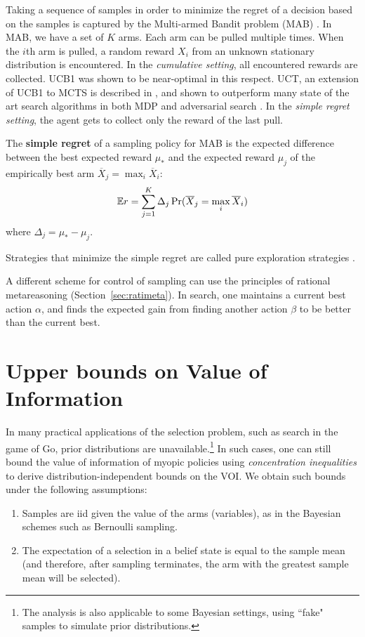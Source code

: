 Taking a sequence of samples in order to minimize the regret of a
decision based on the samples is captured by the Multi-armed Bandit
problem (MAB) \cite{Vermorel.bandits}. In MAB, we have a set of $K$
arms. Each arm can be pulled multiple times. When the $i$th arm is
pulled, a random reward $X_i$ from an unknown stationary distribution
is encountered. In the \textit{cumulative setting}, all encountered rewards are
collected.  UCB1 \cite{Auer.ucb} was shown to be
near-optimal in this respect. UCT, an extension of UCB1 to MCTS is
described in \cite{Kocsis.uct}, and shown to outperform many state of
the art search algorithms in both MDP and adversarial search
\cite{Gelly.mogo,Eyerich.ctp}. In the \textit{simple regret setting}, the agent
gets to collect only the reward of the last pull.
\begin{dfn}
The \textbf{simple regret} of a sampling policy for MAB
is the expected difference between the best expected reward
$\mu_*$ and the expected reward $\mu_j$ of the empirically best arm
$\overline X_j=\max_i\overline X_i$:
\begin{equation}
\mathbb{E} r=\sum_{j=1}^K\Delta_j\Pr(\overline X_j=\max_i\overline X_i)
\label{eqn:mcts-simple-regret}
\end{equation}
where $\Delta_j=\mu_*-\mu_j$.
\end{dfn}
Strategies that minimize the simple regret are called pure exploration
strategies \cite{Bubeck.pure}. 

A different scheme for control of sampling can use the principles of
rational metareasoning (Section~\ref{sec:ratimeta}).  In search, one
maintains a current best action $\alpha$, and finds the expected gain
from finding another action $\beta $ to be better than the current
best.

\section{Upper bounds on Value of Information}
\label{sec:mcts-approx-nonbayesian-section}

In many practical applications of the selection problem, such as search in
the game of Go, prior distributions are unavailable.\footnote{The analysis is also applicable to
some Bayesian settings, using ``fake" samples to simulate prior distributions.}
In such cases, one can still bound
the value of information of myopic policies using {\em concentration
inequalities} to derive distribution-independent bounds on the
VOI. We obtain such bounds under the
following assumptions:
\begin{enumerate}
\item Samples are iid given the value of the arms (variables), as in the Bayesian schemes such as Bernoulli
sampling.
\item The expectation of a selection in a belief state is equal to the sample mean (and therefore,
   after sampling terminates, the arm with the greatest sample mean will be selected).
\end{enumerate}

